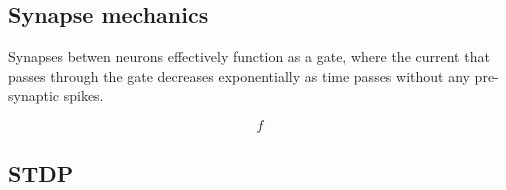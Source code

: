 
\subsection{Synapse mechanics}

Synapses betwen neurons effectively function as a gate, where the current that
passes through the gate decreases exponentially as time passes without any
pre-synaptic spikes. 

\begin{equation}\label{eq:Presynaptic1}
    f
\end{equation}

\subsection{STDP}

